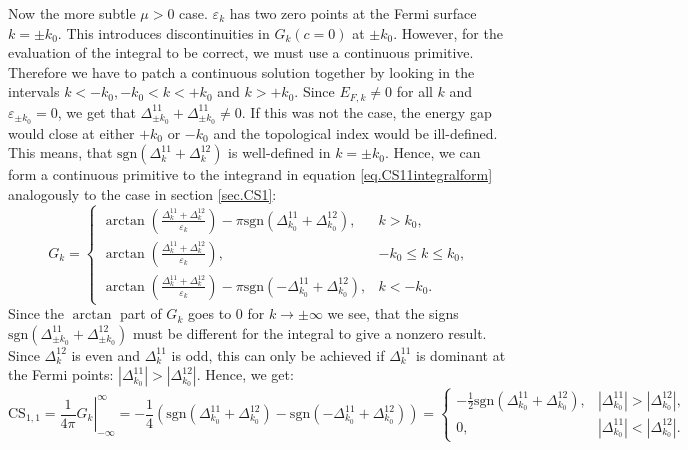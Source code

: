 Now the more subtle $\mu > 0$ case. $\varepsilon_k$ has two zero points at the Fermi surface $k = \pm k_0$. This introduces discontinuities in $G_k(c = 0)$ at $\pm k_0$. However, for the evaluation of the integral to be correct, we must use a continuous primitive. Therefore we have to patch a continuous solution together by looking in the intervals $k < -k_0, -k_0 < k < +k_0$ and $k > +k_0$. Since $E_{F,k} \neq 0$ for all $k$ and $\varepsilon_{\pm k_0} = 0$, we get that $\Delta^{11}_{\pm k_0} + \Delta^{11}_{\pm k_0} \neq 0$. If this was not the case, the energy gap would close at either $+k_0$ or $-k_0$ and the topological index would be ill-defined. This means, that $\text{sgn}(\Delta^{11}_k + \Delta^{12}_k)$ is well-defined in $k = \pm k_0$. Hence, we can form a continuous primitive to the integrand in equation \eqref{eq.CS11integralform} analogously to the case in section \ref{sec.CS1}:
\begin{equation}
G_k = \left\{ \begin{matrix} 
\arctan\left(\frac{\Delta^{11}_k + \Delta^{12}_k }{\varepsilon_k}\right) - \pi\text{sgn}(\Delta^{11}_{k_0} + \Delta^{12}_{k_0}), & k > k_0, \\
\arctan\left(\frac{\Delta^{11}_k + \Delta^{12}_k }{\varepsilon_k}\right), & -k_0 \leq k \leq k_0, \\
\arctan\left(\frac{\Delta^{11}_k + \Delta^{12}_k }{\varepsilon_k}\right) - \pi \text{sgn}(-\Delta^{11}_{k_0} + \Delta^{12}_{k_0}), & k < -k_0.
  \end{matrix} \right.
\label{eq.2wires.Gkmugreater0}
\end{equation}
Since the $\arctan$ part of $G_k$ goes to $0$ for $k\to \pm \infty$ we see, that the signs $\text{sgn}(\Delta^{11}_{\pm k_0} + \Delta^{12}_{\pm k_0})$ must be different for the integral to give a nonzero result. Since $\Delta^{12}_{k}$ is even and $\Delta^{11}_{k}$ is odd, this can only be achieved if $\Delta^{11}_{k}$ is dominant at the Fermi points: $|\Delta^{11}_{k_0}| > |\Delta^{12}_{k_0}|$. Hence, we get:
\begin{equation}
\text{CS}_{1,1} = \left. \frac{1}{4\pi} G_k \right|^\infty_{-\infty} = -\frac{1}{4}(\text{sgn}(\Delta^{11}_{k_0} + \Delta^{12}_{k_0}) - \text{sgn}(-\Delta^{11}_{k_0} + \Delta^{12}_{k_0})) = \left\{ \begin{matrix} 
-\frac{1}{2}\text{sgn}(\Delta^{11}_{k_0} + \Delta^{12}_{k_0}) , & |\Delta^{11}_{k_0}| > |\Delta^{12}_{k_0}|, \\
0, & |\Delta^{11}_{k_0}| < |\Delta^{12}_{k_0}|.
  \end{matrix} \right. \nonumber 
\end{equation}
